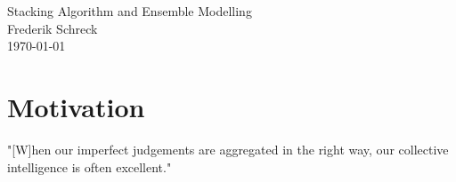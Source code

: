 \documentclass[12pt]{article}
\begin{document}
\begin{center}
{\LARGE Stacking Algorithm and Ensemble Modelling}\\
\vspace{0.5cm}
{\large Frederik Schreck}\\
\vspace{0.5cm}
{\large\today}
\end{center}
\vspace{1cm}


\begin{abstract}
Stacking and Ensemble models currently belong to the most powerful machine learning tools. In depth, this paper introduces and discusses the most important concepts of Stacking and Ensembling. In order to assess their predictive performance in the context of credit risk assessment, a empirical evaluation study is realized on behalf of the German Credit Dataset. Results show that Ensembling models, including a Random Forest and a Gradient Boosting model, outperform standard machine learning models on a broad set of evaluation metrics. Different versions of Stacked Generalization models were able to establish better predictions than their level 0 generalizers. Thereby, more sophisticated Stacking algorithms could establish even better results. The restriction of the subset of input predictions for the Stacked Generalization models was ineffective with regards to performance issues. The results strongly reinforce the value of Stacking and Ensembling strategies for prediction in credit risk assessment problems.
\end{abstract}

\section{Motivation}\label{Intro}
"[W]hen our imperfect judgements are aggregated in the right way, our collective intelligence is often excellent." \citep[Foreword p.XIV]{surowiecki2005wisdom}\\
\end{document}
